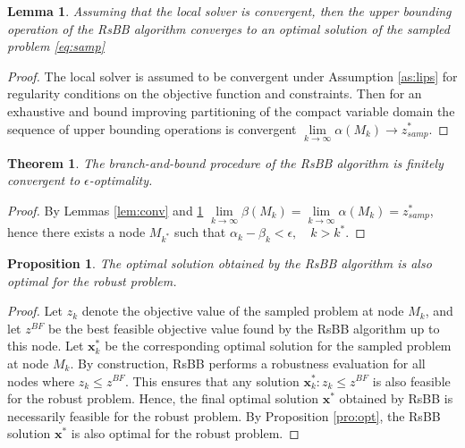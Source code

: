 \documentclass[sn-mathphys-num]{sn-jnl}
\newtheorem{theorem}{Theorem}%
\newtheorem{lemma}{Lemma}
\newtheorem{proposition}{Proposition}
\begin{document}
\begin{lemma}\label{lem:UBconv}
Assuming that the local solver is convergent, then the upper bounding operation of the RsBB algorithm converges to an optimal solution of the sampled problem \eqref{eq:samp}
\end{lemma}

\begin{proof}
 The local solver is assumed to be convergent under Assumption \ref{as:lips} for regularity conditions on the objective function and constraints. Then for an exhaustive and bound improving partitioning of the compact variable domain the sequence of upper bounding operations is convergent $\underset{k\rightarrow \infty}{\lim}\alpha(M_{k})\rightarrow z^*_{samp}$.
\end{proof}

\begin{theorem}\label{lem:bb_conv}
The branch-and-bound procedure of the RsBB algorithm is finitely convergent to $\epsilon$-optimality.
\end{theorem}
\begin{proof}
    By Lemmas \ref{lem:conv} and \ref{lem:UBconv} $\underset{k\rightarrow \infty}{\lim}\beta(M_{k})= \underset{k\rightarrow \infty}{\lim}\alpha(M_{k})=z^*_{samp}$, hence there exists a node $M_{k^*}$ such that $\alpha_k-\beta_k<\epsilon ,\quad k>k^*$.
\end{proof}



\begin{proposition}\label{lem:rob_opt}
The optimal solution obtained by the RsBB algorithm is also optimal for the robust problem.
\end{proposition}

\begin{proof}
Let $z_k$ denote the objective value of the sampled problem at node $M_{k}$, and let $z^{BF}$  be the best feasible objective value found by the RsBB algorithm up to this node. Let  $\bm x^*_k $ be the corresponding optimal solution for the sampled problem at node $M_{k}$. By construction, RsBB performs a robustness evaluation for all nodes where $ z_k \leq z^{BF} $. This ensures that any solution $\bm x^*_k: z_k \leq z^{BF}$ is also feasible for the robust problem. Hence, the final optimal solution $\bm x^*$ obtained by RsBB is necessarily feasible for the robust problem. By Proposition \ref{pro:opt}, the RsBB solution $\bm x^*$ is also optimal for the robust problem.
\end{proof}
\end{document}
